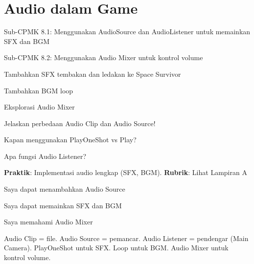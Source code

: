 \documentclass[../main]{subfiles}
\begin{document}
\chapter{Audio dalam Game}

\begin{subcpmk}
  \item Sub-CPMK 8.1: Menggunakan AudioSource dan AudioListener untuk memainkan SFX dan BGM
  \item Sub-CPMK 8.2: Menggunakan Audio Mixer untuk kontrol volume
\end{subcpmk}




\begin{aktivitas}
  \item Tambahkan SFX tembakan dan ledakan ke Space Survivor
  \item Tambahkan BGM loop
  \item Eksplorasi Audio Mixer
\end{aktivitas}

\begin{latihan}
  \item Jelaskan perbedaan Audio Clip dan Audio Source!
  \item Kapan menggunakan PlayOneShot vs Play?
  \item Apa fungsi Audio Listener?
\end{latihan}

\begin{asesmen}
\textbf{Praktik}: Implementasi audio lengkap (SFX, BGM).
\textbf{Rubrik}: Lihat Lampiran A
\end{asesmen}

\begin{checklist}
  \item Saya dapat menambahkan Audio Source
  \item Saya dapat memainkan SFX dan BGM
  \item Saya memahami Audio Mixer
\end{checklist}

\begin{rangkuman}
Audio Clip = file. Audio Source = pemancar. Audio Listener = pendengar (Main Camera). PlayOneShot untuk SFX. Loop untuk BGM. Audio Mixer untuk kontrol volume.
\end{rangkuman}

\ifSubfilesClassLoaded{
  \renewcommand{\bibname}{Daftar Pustaka}
  
  
}{}
\end{document}

